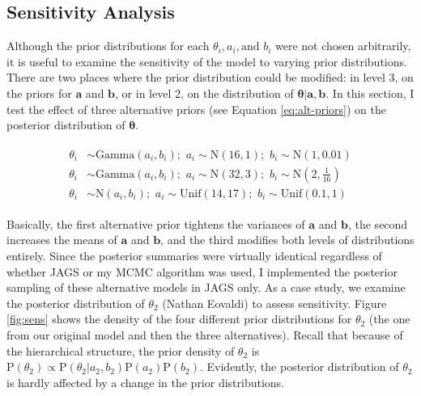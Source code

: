 \documentclass{article}
\begin{document}
\subsection{Sensitivity Analysis}

Although the prior distributions for each $\theta_i, a_i, \text{and } b_i$ were not chosen arbitrarily, it is useful to examine the sensitivity of the model to varying prior distributions. There are two places where the prior distribution could be modified: in level 3, on the priors for $\mathbf{a}$ and $\mathbf{b}$, or in level 2, on the distribution of $\boldsymbol{\theta} | \mathbf{a}, \mathbf{b}$. In this section, I test the effect of three alternative priors (see Equation \ref{eq:alt-priors}) on the posterior distribution of $\boldsymbol{\theta}$.

\begin{align}
    \begin{split}
        \theta_i &\sim \text{Gamma}(a_i, b_i); \hspace{4pt} a_i \sim \text{N}(16, 1); \hspace{4pt} b_i \sim \text{N}(1,0.01) \\
        \theta_i &\sim \text{Gamma}(a_i, b_i); \hspace{4pt} a_i \sim \text{N}(32, 3); \hspace{4pt} b_i \sim \text{N}(2,\frac{1}{16}) \\
        \theta_i &\sim \text{N}(a_i, b_i); \hspace{4pt} a_i \sim \text{Unif}(14,17); \hspace{4pt} b_i \sim \text{Unif}(0.1, 1)
    \end{split}
    \label{eq:alt-priors}
\end{align}

Basically, the first alternative prior tightens the variances of $\mathbf{a}$ and $\mathbf{b}$, the second increases the means of $\mathbf{a}$ and $\mathbf{b}$, and the third modifies both levels of distributions entirely. Since the posterior summaries were virtually identical regardless of whether JAGS or my MCMC algorithm was used, I implemented the posterior sampling of these alternative models in JAGS only. As a case study, we examine the posterior distribution of $\theta_2$ (Nathan Eovaldi) to assess sensitivity. Figure \ref{fig:sens} shows the density of the four different prior distributions for $\theta_2$ (the one from our original model and then the three alternatives). Recall that because of the hierarchical structure, the prior density of $\theta_2$ is $\text{P}(\theta_2) \propto \text{P}(\theta_2|a_2,b_2) \text{P}(a_2)\text{P}(b_2)$. Evidently, the posterior distribution of $\theta_2$ is hardly affected by a change in the prior distributions.
\end{document}
